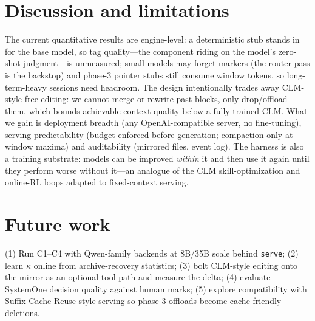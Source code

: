 \documentclass[10pt]{article}
\begin{document}
\section{Discussion and limitations}
The current quantitative results are engine-level: a deterministic stub stands in for the base model, so tag quality---the component riding on the model's zero-shot judgment---is unmeasured; small models may forget markers (the router pass is the backstop) and phase-3 pointer stubs still consume window tokens, so long-term-heavy sessions need headroom. The design intentionally trades away CLM-style free editing: we cannot merge or rewrite past blocks, only drop/offload them, which bounds achievable context quality below a fully-trained CLM. What we gain is deployment breadth (any OpenAI-compatible server, no fine-tuning), serving predictability (budget enforced before generation; compaction only at window maxima) and auditability (mirrored files, event log). The harness is also a training substrate: models can be improved \emph{within} it and then use it again until they perform worse without it---an analogue of the CLM skill-optimization and online-RL loops adapted to fixed-context serving.

\section{Future work}
(1) Run C1--C4 with Qwen-family backends at 8B/35B scale behind \texttt{serve}; (2) learn $\kappa$ online from archive-recovery statistics; (3) bolt CLM-style editing onto the mirror as an optional tool path and measure the delta; (4) evaluate SystemOne decision quality against human marks; (5) explore compatibility with Suffix Cache Reuse-style serving so phase-3 offloads become cache-friendly deletions.
\end{document}
